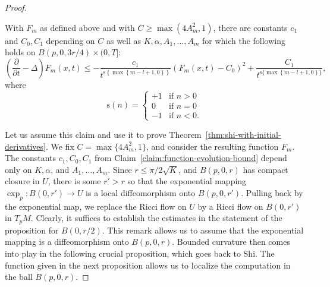 \begin{proof}
\begin{claim}\label{claim:function-evolution-bound}
\label{Fm}
 With $F_m$ as defined above and with $C\ge \max(4A^2_m,1)$,
there are constants $c_1$ and $C_0,C_1$ depending on $C$ as well as
$K,\alpha,A_1,\ldots,A_m$ for which the following holds on
$B(p,0,3r/4)\times (0,T]$:
$$
\left(  \frac{\partial}{\partial t}-\Delta\right)
F_{m}(x,t)\leq-\frac {c_1}{t^{\mathrm{s}\left\{  \max\left\{
m-l+1,0\right\}  \right\} }}\left( F_{m}(x,t)-C_0\right)
^{2}+\frac{C_1}{t^{\mathrm{s}\{\max\left\{ m-l+1,0\right\} \} }},
$$
where
$$\mathrm{s}(n)=\begin{cases} +1 & \text{if } n>0 \\ 0 & \text{if }n=0 \\ -1&
\text{if }n<0.\end{cases}$$
\end{claim}


Let us assume this claim and use it to prove Theorem~\ref{thm:shi-with-initial-derivatives}. We fix
$C=\max\{4A_m^2,1\}$, and consider the resulting function $F_m$. The
constants $c_1,C_0,C_1$ from Claim~\ref{claim:function-evolution-bound} depend only on $K,\alpha$, and
$A_1,\ldots,A_m$. Since $r\le \pi/2\sqrt{K}$, and $B(p,0,r)$ has
compact closure in $U$, there is some $r'>r$ so that the exponential
mapping $\exp_p\colon B(0,r')\to U$ is a local diffeomorphism
onto $B(p,0,r')$. Pulling back by the exponential map, we  replace
the Ricci flow on $U$ by a Ricci flow on $B(0,r')$ in $T_pM$.
Clearly, it suffices to establish the estimates in the statement of
the proposition for $B(0,r/2)$. This remark allows us to assume that
the exponential mapping is a diffeomorphism onto $B(p,0,r)$. Bounded
curvature then comes into play in the following crucial proposition,
which goes back to Shi. The function given in the next proposition allows us to localize
the computation in the ball $B(p,0,r)$.


\end{proof}
